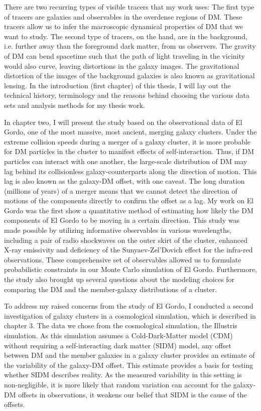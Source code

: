 \documentclass[ucdthesis.tex]{subfiles}
\begin{document}
		There are two recurring types of visible tracers that 
		my work uses: The first type of tracers are galaxies and observables in the 
		 overdense regions of DM. These tracers allow 
		us to infer the macroscopic dynamical properties of DM that we want to study. The
		second type of tracers, on the hand, are in the background, i.e.
		further away than the foreground dark matter, from us observers. The
		gravity of DM can bend spacetime such that the path of light traveling in 
		the vicinity would also curve, leaving distortions in the galaxy images. 
		The gravitational distortion of the images 
		of the background galaxies is also known as gravitational lensing. In the
		introduction (first chapter) of this thesis, I will lay out the technical
		history, terminology and the reasons behind choosing the various data sets
		and analysis methods for my thesis work. 
		
			In chapter two, I will present the study based on the observational data 
			of El Gordo, one of the most massive, most ancient, merging galaxy clusters. 
		Under the extreme collision speeds during a merger of a galaxy cluster, 
		it is more probable for DM particles in the cluster to manifest effects of
		self-interaction. Thus, if DM particles can interact with one another, 		
		the large-scale distribution of DM may lag behind
		its collisionless galaxy-counterparts along the direction of motion. This
		lag is also known as the galaxy-DM offset, with one caveat. The long duration 
		(millions of years) 
		of a merger means that we cannot detect the
		direction of motions of the components directly to confirm the offset as
		a lag. My work on El Gordo was the first show a quantitative method of estimating
		how likely the DM components of El Gordo to be moving in a certain
		direction.	This study was made possible by utilizing informative
		observables in various wavelengths, including a pair of radio shockwaves on
		the outer skirt of the cluster, enhanced X-ray emissivity and deficiency of the
		Sunyaev-Zel'Dovich effect for the infra-red observations.
		These comprehensive set of observables allowed us to formulate 
		probabilistic constraints in our Monte Carlo simulation of El Gordo.
		Furthermore, the study also brought up several questions about the modeling
		choices for comparing the DM and the member-galaxy distributions of a cluster.
		
		To address my raised concerns from the study of El Gordo, 
		I conducted a second investigation of galaxy clusters in a cosmological
		simulation, which is described in chapter 3. The data we chose from the 
		cosmological simulation, the Illustris simulation. As this simulation
		assumes a Cold-Dark-Matter model (CDM) without requiring a self-interacting
		dark matter (SIDM) model, any offset between DM and the member galaxies in a 
		galaxy cluster provides an estimate of the variability of the galaxy-DM offset. This
		estimate provides a basis for testing whether SIDM describes reality. As
		the measured variability in this setting is non-negligible, it is more
		likely that random variation can account for the
		galaxy-DM offsets in observations, it weakens our belief that SIDM is the
		cause of the offsets. 
\end{document}
